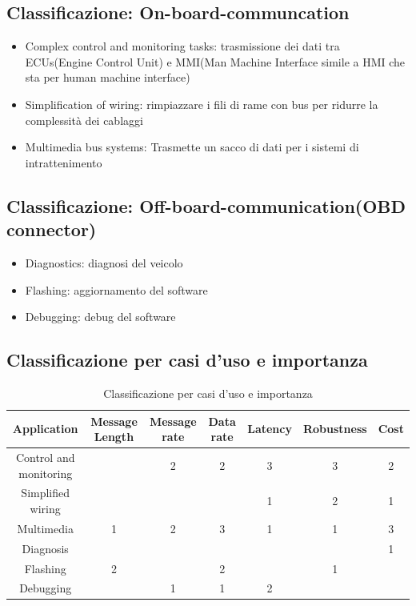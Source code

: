 \subsection{Classificazione: On-board-communcation}
\begin{itemize}
	\item Complex control and monitoring tasks: trasmissione dei dati tra ECUs(Engine Control Unit) e MMI(Man Machine Interface simile a HMI che sta per human machine interface)
	\item Simplification of wiring: rimpiazzare i fili di rame con bus per ridurre la complessità dei cablaggi
	\item Multimedia bus systems: Trasmette un sacco di dati per i sistemi di intrattenimento
\end{itemize}


\subsection{Classificazione: Off-board-communication(OBD connector)}
\begin{itemize}
	\item Diagnostics: diagnosi del veicolo
	\item Flashing: aggiornamento del software
	\item Debugging: debug del software
\end{itemize}

\subsection{Classificazione per casi d'uso e importanza}

\begin{table}[!ht]
	\begin{adjustbox}{width=\columnwidth,center}
		\begin{tabular}{|c|c|c|c|c|c|c|}
			\hline
			Application            & Message Length & Message rate & Data rate & Latency & Robustness & Cost \\
			\hline
			Control and monitoring &                & 2            & 2         & 3       & 3          & 2    \\
			\hline
			Simplified wiring      &                &              &           & 1       & 2          & 1    \\
			\hline
			Multimedia             & 1              & 2            & 3         & 1       & 1          & 3    \\
			\hline
			Diagnosis              &                &              &           &         &            & 1    \\
			\hline
			Flashing               & 2              &              & 2         &         & 1          &      \\
			\hline
			Debugging              &                & 1            & 1         & 2       &            &      \\
			\hline
		\end{tabular}
	\end{adjustbox}
	\caption{Classificazione per casi d'uso e importanza}
	\label{tab:classification_use_case}
\end{table}


